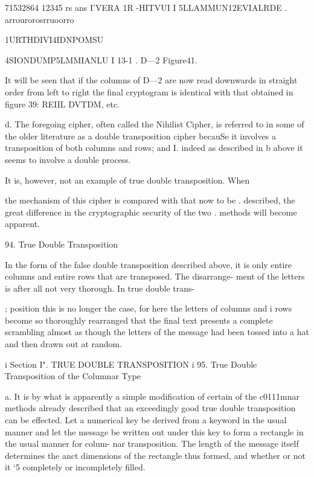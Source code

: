 { 

 

 

 

 

 

71532864 12345 rs
ans I'VERA 1R -HITVUI
I 5LLAMMUN12EVIALRDE
. arrourorosrruoorro

1URTHDIVI4IDNPOMSU

4SIONDUMP5LMMIANLU
I 13-1 . D—2
Figure41.

It will be seen that if the columns of D—2 are now read downwards
in straight order from left to right the ﬁnal cryptogram is identical
with that obtained in ﬁgure 39: REIIL DVTDM, etc.

d. The foregoing cipher, often called the Nihilist Cipher, is referred
to in some of the older literature as a double transposition cipher
becauSe it involves a transposition of both columns and rows; and
I. indeed as described in b above it seems to involve a double process.

It is, however, not an example of true double transposition. When

the mechanism of this cipher is compared with that now to be
. described, the great difference in the cryptographic security of the two
. methods will become apparent.

94. True Double Transposition

In the form of the false double transposition described above, it is
only entire columns and entire rows that are transposed. The disarrange-
ment of the letters is after all not very thorough. In true double trans-

; position this is no longer the case, for here the letters of columns and
i rows become so thoroughly rearranged that the ﬁnal text presents a
complete scrambling almost as though the letters of the message had
been tossed into a hat and then drawn out at random.

i Section I". TRUE DOUBLE TRANSPOSITION
i 95. True Double Transposition of the Columnar Type

a. It is by what is apparently a simple modiﬁcation of certain of the
c0111mnar methods already described that an exceedingly good true
double transposition can be effected. Let a numerical key be derived
from a keyword in the usual manner and let the message be written
out under this key to form a rectangle in the usual manner for colum-
nar transposition. The length of the message itself determines the
anct dimensions of the rectangle thus formed, and whether or not it
‘5 completely or incompletely ﬁlled.

}
